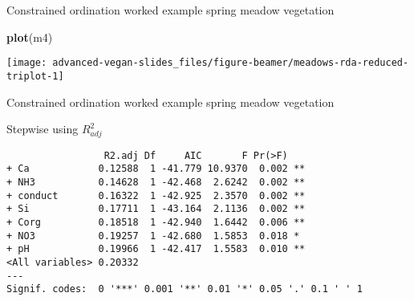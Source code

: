 \documentclass[10pt,ignorenonframetext,compress, aspectratio=169]{beamer}
\newenvironment{Shaded}{\begin{snugshade}}{\end{snugshade}}
\newcommand{\KeywordTok}[1]{\textcolor[rgb]{0.13,0.29,0.53}{\textbf{{#1}}}}
\newcommand{\DataTypeTok}[1]{\textcolor[rgb]{0.13,0.29,0.53}{{#1}}}
\newcommand{\StringTok}[1]{\textcolor[rgb]{0.31,0.60,0.02}{{#1}}}
\newcommand{\OtherTok}[1]{\textcolor[rgb]{0.56,0.35,0.01}{{#1}}}
\newcommand{\NormalTok}[1]{{#1}}
\begin{document}
\begin{frame}[fragile]{Constrained ordination worked example \textbar{}
spring meadow vegetation}

\scriptsize

\begin{Shaded}
\begin{Highlighting}[]
\KeywordTok{plot}\NormalTok{(m4)}
\end{Highlighting}
\end{Shaded}

\begin{center}\texttt{[image: advanced-vegan-slides\_files/figure-beamer/meadows-rda-reduced-triplot-1]} \end{center}

\normalsize

\end{frame}

\begin{frame}[fragile]{Constrained ordination worked example \textbar{}
spring meadow vegetation}

Stepwise using \(R^2_{adj}\)

\scriptsize

\begin{Shaded}
\end{Shaded}

\begin{verbatim}
                 R2.adj Df     AIC       F Pr(>F)   
+ Ca            0.12588  1 -41.779 10.9370  0.002 **
+ NH3           0.14628  1 -42.468  2.6242  0.002 **
+ conduct       0.16322  1 -42.925  2.3570  0.002 **
+ Si            0.17711  1 -43.164  2.1136  0.002 **
+ Corg          0.18518  1 -42.940  1.6442  0.006 **
+ NO3           0.19257  1 -42.680  1.5853  0.018 * 
+ pH            0.19966  1 -42.417  1.5583  0.010 **
<All variables> 0.20332                             
---
Signif. codes:  0 '***' 0.001 '**' 0.01 '*' 0.05 '.' 0.1 ' ' 1
\end{verbatim}

\normalsize

\end{frame}
\end{document}
